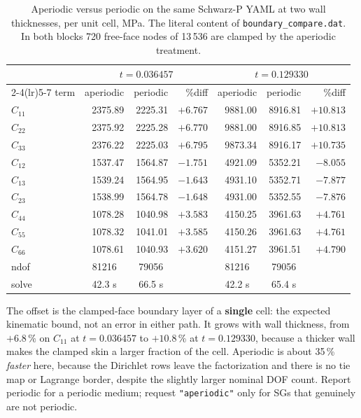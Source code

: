 \begin{table}[htbp]
\centering
\small
\begin{tabular}{lrrr@{\hskip 2em}rrr}
\toprule
 & \multicolumn{3}{c}{$t = 0.036457$} & \multicolumn{3}{c}{$t = 0.129330$} \\
\cmidrule(lr){2-4}\cmidrule(lr){5-7}
term & aperiodic & periodic & \%diff & aperiodic & periodic & \%diff \\
\midrule
$C_{11}$ & 2375.89 & 2225.31 & $+6.767$ & 9881.00 & 8916.81 & $+10.813$ \\
$C_{22}$ & 2375.92 & 2225.28 & $+6.770$ & 9881.00 & 8916.85 & $+10.813$ \\
$C_{33}$ & 2376.22 & 2225.03 & $+6.795$ & 9873.34 & 8916.17 & $+10.735$ \\
$C_{12}$ & 1537.47 & 1564.87 & $-1.751$ & 4921.09 & 5352.21 & $-8.055$ \\
$C_{13}$ & 1539.24 & 1564.95 & $-1.643$ & 4931.10 & 5352.71 & $-7.877$ \\
$C_{23}$ & 1538.99 & 1564.78 & $-1.648$ & 4931.00 & 5352.55 & $-7.876$ \\
$C_{44}$ & 1078.28 & 1040.98 & $+3.583$ & 4150.25 & 3961.63 & $+4.761$ \\
$C_{55}$ & 1078.32 & 1041.01 & $+3.585$ & 4150.26 & 3961.63 & $+4.761$ \\
$C_{66}$ & 1078.61 & 1040.93 & $+3.620$ & 4151.27 & 3961.51 & $+4.790$ \\
\midrule
ndof     & \multicolumn{1}{c}{81216} & \multicolumn{1}{c}{79056} & &
           \multicolumn{1}{c}{81216} & \multicolumn{1}{c}{79056} & \\
solve    & \multicolumn{1}{c}{42.3 s} & \multicolumn{1}{c}{66.5 s} & &
           \multicolumn{1}{c}{42.2 s} & \multicolumn{1}{c}{65.4 s} & \\
\bottomrule
\end{tabular}
\caption{Aperiodic versus periodic on the same Schwarz-P YAML at two wall
thicknesses, per unit cell, MPa. The literal content of
\texttt{boundary\_compare.dat}. In both blocks 720 free-face nodes of 13\,536 are
clamped by the aperiodic treatment.}
\label{tab:schwarz-boundary}
\end{table}

The offset is the clamped-face boundary layer of a \textbf{single} cell: the
expected kinematic bound, not an error in either path. It grows with wall
thickness, from $+6.8$\,\% on $C_{11}$ at $t = 0.036457$ to $+10.8$\,\% at
$t = 0.129330$, because a thicker wall makes the clamped skin a larger fraction of
the cell. Aperiodic is about 35\,\% \emph{faster} here, because the Dirichlet
rows leave the factorization and there is no tie map or Lagrange border, despite
the slightly larger nominal DOF count. Report periodic for a periodic medium;
request \texttt{"aperiodic"} only for SGs that genuinely are not periodic.

